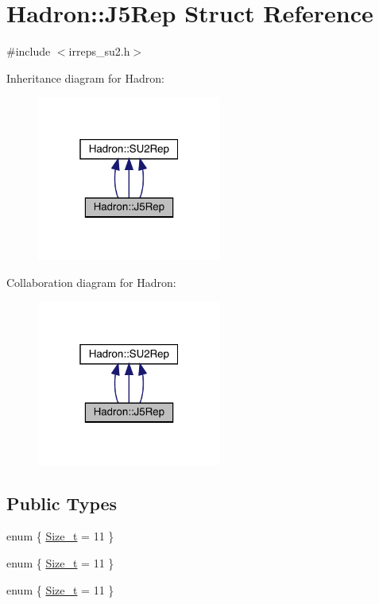 \hypertarget{structHadron_1_1J5Rep}{}\section{Hadron\+:\+:J5\+Rep Struct Reference}
\label{structHadron_1_1J5Rep}


{\ttfamily \#include $<$irreps\+\_\+su2.\+h$>$}



Inheritance diagram for Hadron\+:
\nopagebreak
\begin{figure}[H]
\begin{center}
\leavevmode
\includegraphics[width=172pt]{d8/d65/structHadron_1_1J5Rep__inherit__graph}
\end{center}
\end{figure}


Collaboration diagram for Hadron\+:
\nopagebreak
\begin{figure}[H]
\begin{center}
\leavevmode
\includegraphics[width=172pt]{d9/da1/structHadron_1_1J5Rep__coll__graph}
\end{center}
\end{figure}
\subsection*{Public Types}
\begin{DoxyCompactItemize}
\item 
enum \{ \mbox{\hyperlink{structHadron_1_1J5Rep_a0e20d7ac8184129af6606e00fdc7e96ba114ac1ed2dab800e721cda73a81aba18}{Size\+\_\+t}} = 11
 \}
\item 
enum \{ \mbox{\hyperlink{structHadron_1_1J5Rep_a0e20d7ac8184129af6606e00fdc7e96ba114ac1ed2dab800e721cda73a81aba18}{Size\+\_\+t}} = 11
 \}
\item 
enum \{ \mbox{\hyperlink{structHadron_1_1J5Rep_a0e20d7ac8184129af6606e00fdc7e96ba114ac1ed2dab800e721cda73a81aba18}{Size\+\_\+t}} = 11
 \}
\end{DoxyCompactItemize}
